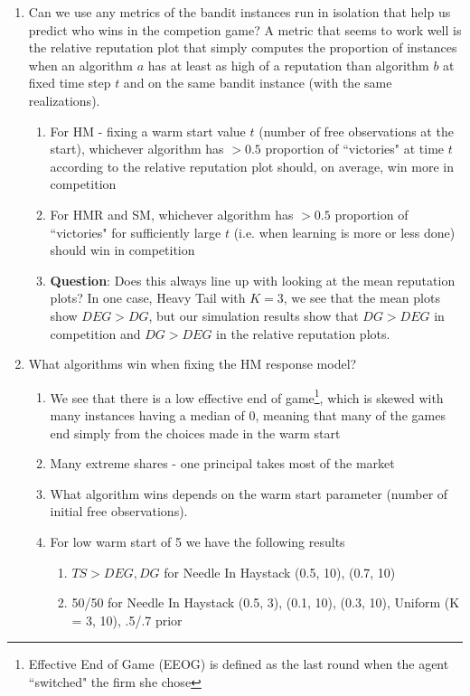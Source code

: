 \documentclass[11pt,letterpaper]{article}
\begin{document}
\begin{enumerate}
\item Can we use any metrics of the bandit instances run in isolation that help us predict who wins in the competion game? A metric that seems to work well is the relative reputation plot that simply computes the proportion of instances when an algorithm $a$ has at least as high of a reputation than algorithm $b$ at fixed time step $t$ and on the same bandit instance (with the same realizations).
\begin{enumerate}
\item For HM - fixing a warm start value $t$ (number of free observations at the start), whichever algorithm has $>0.5$ proportion of ``victories" at time $t$ according to the relative reputation plot should, on average, win more in competition
\item For HMR and SM, whichever algorithm has $>0.5$ proportion of ``victories" for sufficiently large $t$ (i.e. when learning is more or less done) should win in competition
\item \textbf{Question}: Does this always line up with looking at the mean reputation plots? In one case, Heavy Tail with $K = 3$, we see that the mean plots show $DEG > DG$, but our simulation results show that $DG > DEG$ in competition and $DG > DEG$ in the relative reputation plots.
\end{enumerate}
\item What algorithms win when fixing the HM response model?
\begin{enumerate}
\item We see that there is a low effective end of game\footnote{Effective End of Game (EEOG) is defined as the last round when the agent ``switched" the firm she chose}, which is skewed with many instances having a median of 0, meaning that many of the games end simply from the choices made in the warm start
\item Many extreme shares - one principal takes most of the market
\item What algorithm wins depends on the warm start parameter (number of initial free observations). 
\item For low warm start of 5 we have the following results
\begin{enumerate}
\item $TS > DEG, DG$ for Needle In Haystack (0.5, 10), (0.7, 10)
\item 50/50 for Needle In Haystack (0.5, 3), (0.1, 10), (0.3, 10),  Uniform (K = 3, 10), .5/.7 prior

\end{enumerate}
\end{enumerate}
\end{enumerate}
\end{document}
